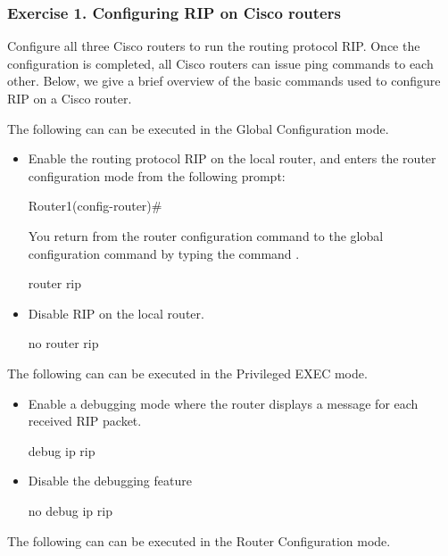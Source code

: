 \subsubsection*{Exercise 1. Configuring RIP on Cisco routers}

Configure all three Cisco routers to run the routing protocol RIP. Once the configuration is completed, all Cisco routers can issue ping commands to each other. Below, we give a brief overview of the basic commands used to configure RIP on a Cisco router.

The following can can be executed in the Global Configuration mode.

\begin{itemize}
	\item Enable the routing protocol RIP on the local router, and enters the router configuration mode from the following prompt:
		\begin{cmdblock}
	Router1(config-router)#
		\end{cmdblock}
		You return from the router configuration command to the global configuration command by typing the command .
		\begin{cmdblock}
	router rip
		\end{cmdblock}
	\item Disable RIP on the local router.
		\begin{cmdblock}
	no router rip
		\end{cmdblock}
\end{itemize}

The following can can be executed in the Privileged EXEC mode.

\begin{itemize}
	\item Enable a debugging mode where the router displays a message for each received RIP packet.
		\begin{cmdblock}
	debug ip rip
		\end{cmdblock}
	\item Disable the debugging feature
		\begin{cmdblock}
no debug ip rip
		\end{cmdblock}
\end{itemize}

The following can can be executed in the Router Configuration mode.

